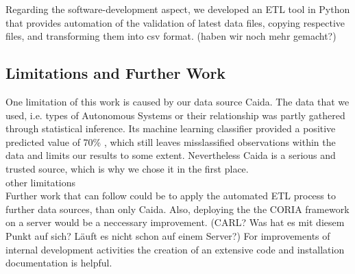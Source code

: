 \documentclass[conference, 11pt]{IEEEtran}
\begin{document}
Regarding the software-development aspect, we developed an ETL tool in Python that provides automation of the validation of latest data files, copying respective files, and transforming them into csv format.  (haben wir noch mehr gemacht?)

 

\subsection{Limitations and Further Work}

 
One limitation of this work is caused by our data source Caida. The data that we used, i.e. types of Autonomous Systems or their relationship was partly gathered through statistical inference. Its machine learning classifier provided a positive predicted value of 70\% \cite{Classification}, which still leaves misslassified observations within the data and limits our results to some extent. Nevertheless Caida is a serious and trusted source, which is why we chose it in the first place. \\ 

other limitations\\



Further work that can follow could be to apply the automated ETL process to further data sources, than only Caida. Also, deploying the the CORIA framework on a server would be a neccessary improvement. (CARL? Was hat es mit diesem Punkt auf sich? Läuft es nicht schon auf einem Server?) For improvements of internal development activities the creation of an extensive code and installation documentation is helpful.
\end{document}
